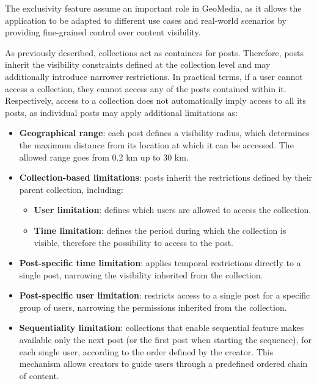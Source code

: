 The exclusivity feature assume an important role in GeoMedia, as it allows the application to be adapted to different use cases and real-world scenarios by providing fine-grained control over content visibility.

As previously described, collections act as containers for posts. Therefore, posts inherit the visibility constraints defined at the collection level and may additionally introduce narrower restrictions. In practical terms, if a user cannot access a collection, they cannot access any of the posts contained within it. \\
Respectively, access to a collection does not automatically imply access to all its posts, as individual posts may apply additional limitations as:

\begin{itemize}
    \item \textbf{Geographical range}: each post defines a visibility radius, which determines the maximum distance from its location at which it can be accessed. The allowed range goes from 0.2 km up to 30 km.
    \item \textbf{Collection-based limitations}: posts inherit the restrictions defined by their parent collection, including:
    \begin{itemize}
        \item \textbf{User limitation}: defines which users are allowed to access the collection.
        \item \textbf{Time limitation}: defines the period during which the collection is visible, therefore the possibility to access to the post.
    \end{itemize}
    \item \textbf{Post-specific time limitation}: applies temporal restrictions directly to a single post, narrowing the visibility inherited from the collection.
    \item \textbf{Post-specific user limitation}: restricts access to a single post for a specific group of users, narrowing the permissions inherited from the collection.
    \item \textbf{Sequentiality limitation}: collections that enable sequential feature makes available only the next post (or the first post when starting the sequence), for each single user, according to the order defined by the creator. This mechanism allows creators to guide users through a predefined ordered chain of content.
\end{itemize}


